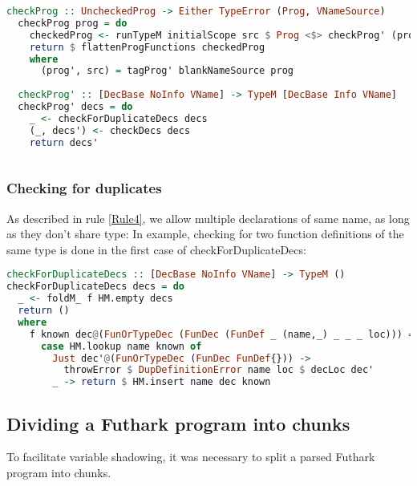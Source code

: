 \begin{lstlisting}[language=Haskell]
  checkProg :: UncheckedProg -> Either TypeError (Prog, VNameSource)
  checkProg prog = do
    checkedProg <- runTypeM initialScope src $ Prog <$> checkProg' (progDecs prog')
    return $ flattenProgFunctions checkedProg
    where
      (prog', src) = tagProg' blankNameSource prog
  
  checkProg' :: [DecBase NoInfo VName] -> TypeM [DecBase Info VName]
  checkProg' decs = do
    _ <- checkForDuplicateDecs decs
    (_, decs') <- checkDecs decs
    return decs'
  
\end{lstlisting}
\subsubsection{Checking for duplicates}
\label{subsec:checkingforduplicates}

As described in rule \ref{Rule4}, we allow multiple declarations of same name,
as long as they don't share type:
In example, checking for two function definitions of the same type is done in
the first case of checkForDuplicateDecs:

\begin{lstlisting}[language=Haskell]
checkForDuplicateDecs :: [DecBase NoInfo VName] -> TypeM ()
checkForDuplicateDecs decs = do
  _ <- foldM_ f HM.empty decs
  return ()
  where
    f known dec@(FunOrTypeDec (FunDec (FunDef _ (name,_) _ _ _ loc))) =
      case HM.lookup name known of
        Just dec'@(FunOrTypeDec (FunDec FunDef{})) ->
          throwError $ DupDefinitionError name loc $ decLoc dec'
        _ -> return $ HM.insert name dec known
\end{lstlisting}

\subsection{Dividing a Futhark program into chunks}
To facilitate variable shadowing, it was necessary to split a parsed Futhark
program into chunks.

